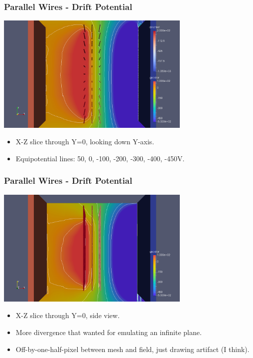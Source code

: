 \documentclass[xcolor=dvipsnames]{beamer}
\begin{document}
\begin{frame}
  \frametitle{Parallel Wires - Drift Potential}
  \begin{center}
    \includegraphics[width=0.7\textwidth]{twodee-fine-drift-plan.png}
  \end{center}
  \begin{itemize}\footnotesize
  \item X-Z slice through Y=0, looking down Y-axis.
  \item Equipotential lines: 50, 0, -100, -200, -300, -400, -450V.
  \end{itemize}
\end{frame}
\begin{frame}
  \frametitle{Parallel Wires - Drift Potential}
  \begin{center}
    \includegraphics[width=0.7\textwidth]{twodee-fine-drift-side.png}
  \end{center}
  \begin{itemize}\footnotesize
  \item X-Z slice through Y=0, side view.
  \item More divergence that wanted for emulating an infinite plane.
  \item Off-by-one-half-pixel between mesh and field, just drawing artifact (I think).
  \end{itemize}
\end{frame}
\end{document}
